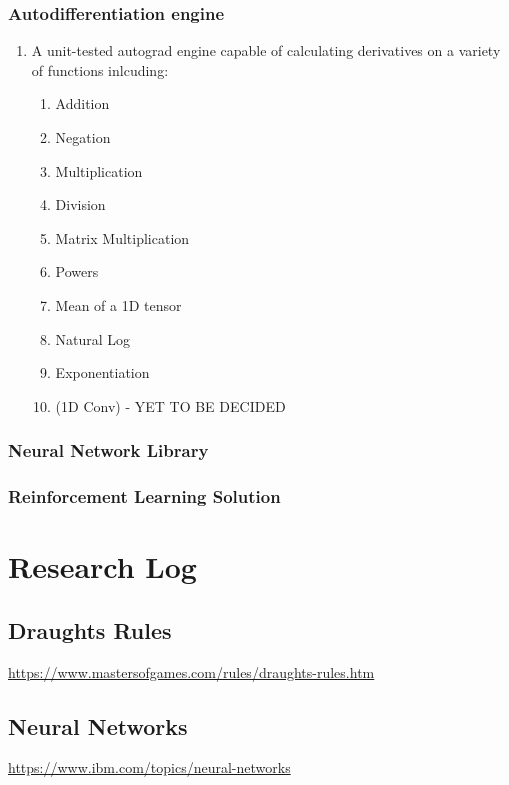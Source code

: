 \documentclass{article}
\begin{document}
    \subsubsection{Autodifferentiation engine}
    \begin{enumerate}
        \item A unit-tested autograd engine capable of calculating derivatives on a variety of functions inlcuding:
        \begin{enumerate}
            \item Addition
            \item Negation
            \item Multiplication
            \item Division
            \item Matrix Multiplication
            \item Powers
            \item Mean of a 1D tensor
            \item Natural Log
            \item Exponentiation
            \item (1D Conv) - YET TO BE DECIDED
        \end{enumerate}
    \end{enumerate}
    \subsubsection{Neural Network Library} 

    \subsubsection{Reinforcement Learning Solution}
    
    \section{Research Log}

    \subsection{Draughts Rules}
    \url{https://www.mastersofgames.com/rules/draughts-rules.htm}

    \subsection{Neural Networks}
    \noindent \url{https://www.ibm.com/topics/neural-networks}
\end{document}
